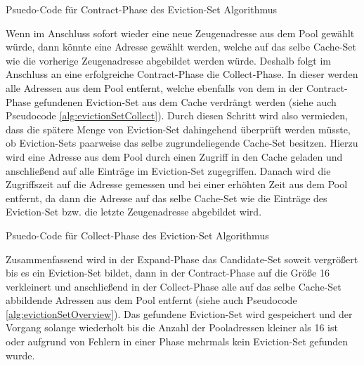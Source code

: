\begin{algorithm}[h]
\DontPrintSemicolon
\caption{Psuedo-Code für Contract-Phase des Eviction-Set Algorithmus}
\label{alg:evictionSetContract}
\end{algorithm}

Wenn im Anschluss sofort wieder eine neue Zeugenadresse aus dem Pool gewählt würde, dann könnte eine Adresse gewählt werden, welche auf das selbe Cache-Set wie die vorherige Zeugenadresse abgebildet werden würde.
Deshalb folgt im Anschluss an eine erfolgreiche Contract-Phase die Collect-Phase.
In dieser werden alle Adressen aus dem Pool entfernt, welche ebenfalls von dem in der Contract-Phase gefundenen Eviction-Set aus dem Cache verdrängt werden (siehe auch Pseudocode \ref{alg:evictionSetCollect}).
Durch diesen Schritt wird also vermieden, dass die spätere Menge von Eviction-Set dahingehend überprüft werden müsste, ob Eviction-Sets paarweise das selbe zugrundeliegende Cache-Set besitzen.
Hierzu wird eine Adresse aus dem Pool durch einen Zugriff in den Cache geladen und anschließend auf alle Einträge im Eviction-Set zugegriffen.
Danach wird die Zugriffszeit auf die Adresse gemessen und bei einer erhöhten Zeit aus dem Pool entfernt, da dann die Adresse auf das selbe Cache-Set wie die Einträge des Eviction-Set bzw. die letzte Zeugenadresse abgebildet wird.

\begin{algorithm}[h]
\DontPrintSemicolon
\caption{Psuedo-Code für Collect-Phase des Eviction-Set Algorithmus}
\label{alg:evictionSetCollect}

\end{algorithm}

Zusammenfassend wird in der Expand-Phase das Candidate-Set soweit vergrößert bis es ein Eviction-Set bildet, dann in der Contract-Phase auf die Größe 16 verkleinert und anschließend in der Collect-Phase alle auf das selbe Cache-Set abbildende Adressen aus dem Pool entfernt (siehe auch Pseudocode \ref{alg:evictionSetOverview}).
Das gefundene Eviction-Set wird gespeichert und der Vorgang solange wiederholt bis die Anzahl der Pooladressen kleiner als 16 ist oder aufgrund von Fehlern in einer Phase mehrmals kein Eviction-Set gefunden wurde.

